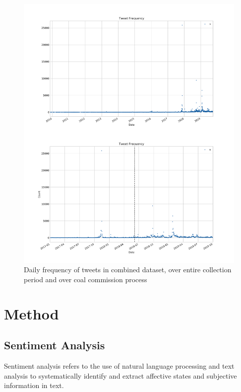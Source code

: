 \documentclass[10pt,twocolumn,twoside]{layout}
\begin{document}
\begin{figure} 
	\begin{center}
		\includegraphics[width=\linewidth]{figures/tweet_frequency_combine}
	\end{center}
	\caption{Daily frequency of tweets in combined dataset, over entire collection period and over coal commission process}
	\label{fig:tweet_frequency}
\end{figure}

\section*{Method} \label{sec:method}
\subsection*{Sentiment Analysis}

Sentiment analysis refers to the use of natural language processing and text analysis to systematically identify and extract affective states and subjective information in text. %
\end{document}
